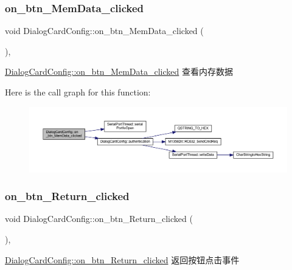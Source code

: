 \subsubsection{\texorpdfstring{on\_btn\_MemData\_clicked}{on\_btn\_MemData\_clicked}}
{\footnotesize\ttfamily void Dialog\+Card\+Config\+::on\+\_\+btn\+\_\+\+Mem\+Data\+\_\+clicked (\begin{DoxyParamCaption}{ }\end{DoxyParamCaption})\hspace{0.3cm}{\ttfamily [private]}, {\ttfamily [slot]}}



\mbox{\hyperlink{class_dialog_card_config_a1959f4e04b85a8366ca705e31a4db85c}{Dialog\+Card\+Config\+::on\+\_\+btn\+\_\+\+Mem\+Data\+\_\+clicked}} 查看内存数据 

Here is the call graph for this function\+:
\nopagebreak
\begin{figure}[H]
\begin{center}
\leavevmode
\includegraphics[width=350pt]{class_dialog_card_config_a1959f4e04b85a8366ca705e31a4db85c_cgraph}
\end{center}
\end{figure}
\mbox{\label{class_dialog_card_config_ae96a2ac9d41cac74dee19642e81972fc}} 
\subsubsection{\texorpdfstring{on\_btn\_Return\_clicked}{on\_btn\_Return\_clicked}}
{\footnotesize\ttfamily void Dialog\+Card\+Config\+::on\+\_\+btn\+\_\+\+Return\+\_\+clicked (\begin{DoxyParamCaption}{ }\end{DoxyParamCaption})\hspace{0.3cm}{\ttfamily [private]}, {\ttfamily [slot]}}



\mbox{\hyperlink{class_dialog_card_config_ae96a2ac9d41cac74dee19642e81972fc}{Dialog\+Card\+Config\+::on\+\_\+btn\+\_\+\+Return\+\_\+clicked}} 返回按钮点击事件 

